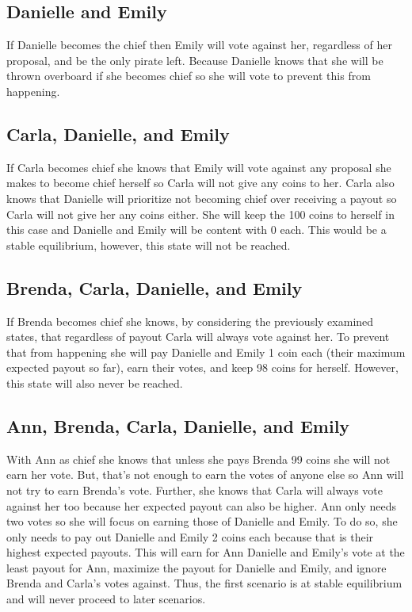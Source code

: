 \documentclass[11pt]{article}
\begin{document}
\subsection{Danielle and Emily}
If Danielle becomes the chief then Emily will vote against her, regardless of her proposal, and be the only pirate left. Because Danielle knows that she will be thrown overboard if she becomes chief so she will vote to prevent this from happening.

\subsection{Carla, Danielle, and Emily}
If Carla becomes chief she knows that Emily will vote against any proposal she makes to become chief herself so Carla will not give any coins to her. Carla also knows that Danielle will prioritize not becoming chief over receiving a payout so Carla will not give her any coins either. She will keep the 100 coins to herself in this case and Danielle and Emily will be content with 0 each. This would be a stable equilibrium, however, this state will not be reached. 

\subsection{Brenda, Carla, Danielle, and Emily}
If Brenda becomes chief she knows, by considering the previously examined states, that regardless of payout Carla will always vote against her. To prevent that from happening she will pay Danielle and Emily 1 coin each (their maximum expected payout so far), earn their votes, and keep 98 coins for herself. However, this state will also never be reached. 

\subsection{Ann, Brenda, Carla, Danielle, and Emily}
With Ann as chief she knows that unless she pays Brenda 99 coins she will not earn her vote. But, that's not enough to earn the votes of anyone else so Ann will not try to earn Brenda's vote. Further, she knows that Carla will always vote against her too because her expected payout can also be higher. Ann only needs two votes so she will focus on earning those of Danielle and Emily. To do so, she only needs to pay out Danielle and Emily 2 coins each because that is their highest expected payouts. This will earn for Ann Danielle and Emily's vote at the least payout for Ann, maximize the payout for Danielle and Emily, and ignore Brenda and Carla's votes against. Thus, the first scenario is at stable equilibrium and will never proceed to later scenarios.
\end{document}
